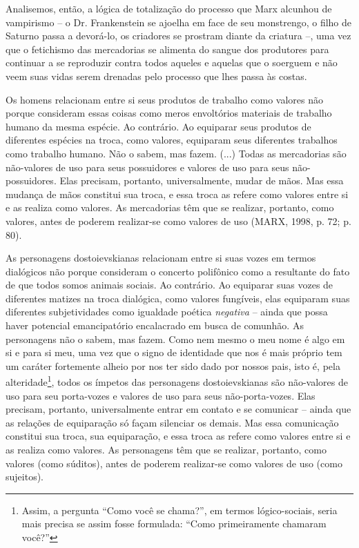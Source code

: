Analisemos, então, a lógica de totalização do processo que Marx alcunhou
de vampirismo -- o Dr. Frankenstein se ajoelha em face de seu
monstrengo, o filho de Saturno passa a devorá-lo, os criadores se
prostram diante da criatura --, uma vez que o fetichismo das mercadorias
se alimenta do sangue dos produtores para continuar a se reproduzir
contra todos aqueles e aquelas que o soerguem e não veem suas vidas
serem drenadas pelo processo que lhes passa às costas.

Os homens relacionam entre si seus produtos de trabalho como valores não
porque consideram essas coisas como meros envoltórios materiais de
trabalho humano da mesma espécie. Ao contrário. Ao equiparar seus
produtos de diferentes espécies na troca, como valores, equiparam seus
diferentes trabalhos como trabalho humano. Não o sabem, mas fazem. (...)
Todas as mercadorias são não-valores de uso para seus possuidores e
valores de uso para seus não-possuidores. Elas precisam, portanto,
universalmente, mudar de mãos. Mas essa mudança de mãos constitui sua
troca, e essa troca as refere como valores entre si e as realiza como
valores. As mercadorias têm que se realizar, portanto, como valores,
antes de poderem realizar-se como valores de uso (MARX, 1998, p. 72; p.
80).

As personagens dostoievskianas relacionam entre si suas vozes em termos
dialógicos não porque consideram o concerto polifônico como a resultante
do fato de que todos somos animais sociais. Ao contrário. Ao equiparar
suas vozes de diferentes matizes na troca dialógica, como valores
fungíveis, elas equiparam suas diferentes subjetividades como igualdade
poética \emph{negativa} -- ainda que possa haver potencial emancipatório
encalacrado em busca de comunhão. As personagens não o sabem, mas fazem.
Como nem mesmo o meu nome é algo em si e para si meu, uma vez que o
signo de identidade que nos é mais próprio tem um caráter fortemente
alheio por nos ter sido dado por nossos pais, isto é, pela
alteridade\footnote{Assim, a pergunta ``Como você se chama?'', em termos
  lógico-sociais, seria mais precisa se assim fosse formulada: ``Como
  primeiramente chamaram você?''}, todos os ímpetos das personagens
dostoievskianas são não-valores de uso para seu porta-vozes e valores de
uso para seus não-porta-vozes. Elas precisam, portanto, universalmente
entrar em contato e se comunicar -- ainda que as relações de equiparação
só façam silenciar os demais. Mas essa comunicação constitui sua troca,
sua equiparação, e essa troca as refere como valores entre si e as
realiza como valores. As personagens têm que se realizar, portanto, como
valores (como súditos), antes de poderem realizar-se como valores de uso
(como sujeitos).

